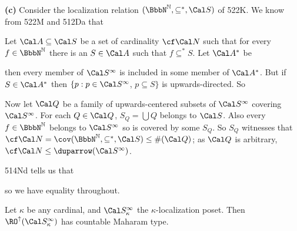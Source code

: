 {\medskip

{\bf (c)} Consider the localization relation $(\NN,\subseteq^*,\Cal S)$
of 522K.   We know from 522M and 512Da that


\medskip

 Let $\Cal A\subseteq\Cal S$ be a set of cardinality
$\cf\Cal N$ such that for every $f\in\NN$ there is an $S\in\Cal A$ such
that $f\subseteq^*S$.   Let $\Cal A^*$ be


\noindent then every member of
$\Cal S^{\infty}$ is included in some member of $\Cal A^*$.   But if
$S\in\Cal A^*$ then $\{p:p\in\Cal S^{\infty}$, $p\subseteq S\}$ is
upwards-directed.   So


\medskip

 Now let $\Cal Q$ be a family of upwards-centered subsets
of $\Cal S^{\infty}$ covering $\Cal S^{\infty}$.   For each
$Q\in\Cal Q$, $S_Q=\bigcup Q$ belongs to $\Cal S$.   Also every
$f\in\NN$ belongs to $\Cal S^{\infty}$ so is covered by some $S_Q$.   So
$S_Q$ witnesses that
$\cf\Cal N=\cov(\NN,\subseteq^*,\Cal S)\le\#(\Cal Q)$;  as $\Cal Q$ is
arbitrary, $\cf\Cal N\le\duparrow(\Cal S^{\infty})$.

\medskip

 514Nd tells us that


\noindent so we have equality throughout.
}%

 Let $\kappa$ be any cardinal, and
$\Cal S^{\infty}_{\kappa}$ the $\kappa$-localization poset.
Then $\RO^{\uparrow}(\Cal S^{\infty}_{\kappa})$ has countable Maharam
type.

